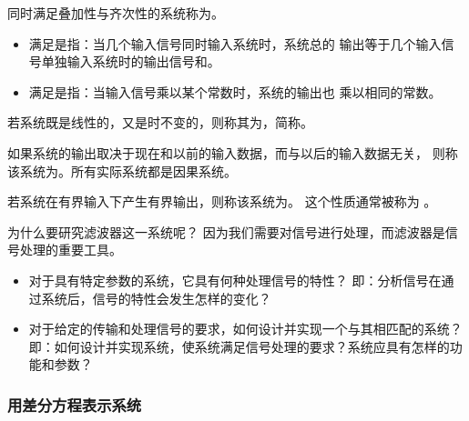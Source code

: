 \begin{definition}[线性系统]
    同时满足叠加性与齐次性的系统称为。
    \begin{itemize}
        \item 满足是指：当几个输入信号同时输入系统时，系统总的
            输出等于几个输入信号单独输入系统时的输出信号和。
        \item 满足是指：当输入信号乘以某个常数时，系统的输出也
            乘以相同的常数。
    \end{itemize}
\end{definition}

\begin{definition}[时不变系统]
    若系统既是线性的，又是时不变的，则称其为，简称。
\end{definition}

\begin{definition}[因果系统]
    如果系统的输出取决于现在和以前的输入数据，而与以后的输入数据无关，
    则称该系统为。所有实际系统都是因果系统。
\end{definition}

\begin{definition}[稳定系统]
    若系统在有界输入下产生有界输出，则称该系统为。
    这个性质通常被称为 。
\end{definition}

\begin{remark}
    为什么要研究滤波器这一系统呢？
    因为我们需要对信号进行处理，而滤波器是信号处理的重要工具。
    \begin{itemize}
        \item 对于具有特定参数的系统，它具有何种处理信号的特性？
            \subitem 即：分析信号在通过系统后，信号的特性会发生怎样的变化？
        \item 对于给定的传输和处理信号的要求，如何设计并实现一个与其相匹配的系统？
            \subitem 即：如何设计并实现系统，使系统满足信号处理的要求？系统应具有怎样的功能和参数？
    \end{itemize}
\end{remark}

\subsubsection{用差分方程表示系统}

\label{subsubsection:diff-equation-representation}

